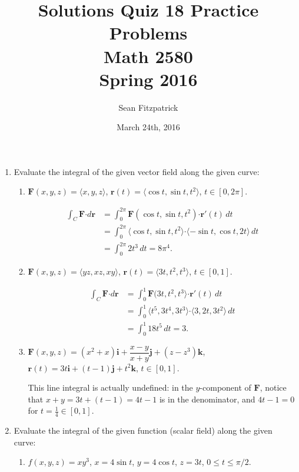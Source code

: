 \documentclass[letterpaper,12pt]{article}
\title{Solutions Quiz 18 Practice Problems\\Math 2580\\Spring 2016}
\author{Sean Fitzpatrick}
\date{March 24th, 2016}
\renewcommand{\i}{\mathbf{i}}
\renewcommand{\j}{\mathbf{j}}
\renewcommand{\k}{\mathbf{k}}
\renewcommand{\r}{\mathbf{r}}
\newcommand{\dotp}{\boldsymbol{\cdot}}
\newcommand{\F}{\mathbf{F}}
\begin{document}
 \maketitle


\begin{enumerate}
 \item Evaluate the integral of the given vector field along the given curve:
\begin{enumerate}
 \item $\F(x,y,z) = \langle x, y, z\rangle$, $\r(t) = \langle \cos t, \sin t, t^2\rangle$, $t\in [0,2\pi]$.

\bigskip

\begin{align*}
 \int_C \F\dotp d\r & = \int_0^{2\pi} \F(\cos t, \sin t, t^2)\dotp \r'(t)\,dt\\
& = \int_0^{2\pi}\langle \cos t, \sin t, t^2\rangle \dotp \langle -\sin t, \cos t, 2t\rangle\,dt\\
& = \int_0^{2\pi} 2t^3\,dt = 8\pi^4.
\end{align*}

 \item $\F(x,y,z) = \langle yz, xz, xy\rangle$, $\r(t) = \langle 3t, t^2, t^3\rangle$, $t\in [0,1]$.

\bigskip

\begin{align*}
 \int_C\F\dotp d\r & = \int_0^1 \F(3t, t^2, t^3\rangle\dotp \r'(t)\,dt\\
& = \int_0^1 \langle t^5, 3t^4, 3t^3\rangle\dotp\langle 3, 2t, 3t^2\rangle\,dt\\
& = \int_0^1 18t^5\,dt = 3.
\end{align*}

 \item $\F(x,y,z) = (x^2+x)\i+\dfrac{x-y}{x+y}\j+(z-z^3)\k$, $\r(t) = 3t\i+(t-1)\j+t^2\k$, $t\in [0,1]$.

\bigskip

This line integral is actually undefined: in the $y$-component of $\F$, notice that $x+y=3t+(t-1) = 4t-1$ is in the denominator, and $4t-1=0$ for $t=\frac{1}{4}\in [0,1]$.

\end{enumerate}
 \item Evaluate the integral of the given function (scalar field) along the given curve:
\begin{enumerate}
 \item $f(x,y,z)=xy^3$, $x=4\sin t$, $y= 4\cos t$, $z=3t$, $0\leq t\leq \pi/2$.


\end{enumerate}
\end{enumerate}
\end{document}
